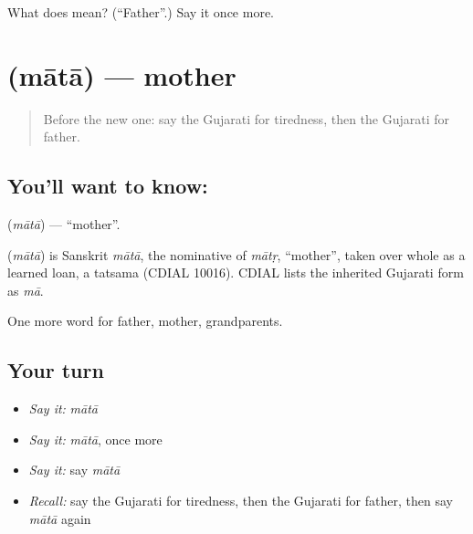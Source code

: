 \begin{tcolorbox}[breakable,colback=teal!4,colframe=teal!35!black,title={Before you move on}]
What does  mean? (\textquotedblleft{}Father\textquotedblright{}.) Say it once more.
\end{tcolorbox}
\section[\texorpdfstring{\gu{માતા} (mātā)}{માતા (mātā)}]{ (mātā) — mother}

\label{lesson:GU-C51-mother}



\begin{quote}
Before the new one: say the Gujarati for tiredness, then the Gujarati for father.
\end{quote}

\subsection*{You'll want to know: }
\textbf{} (\emph{mātā}) — \textquotedblleft{}mother\textquotedblright{}.

\begin{cousinweb}
\textbf{} (\emph{mātā}) is Sanskrit \emph{mātā}, the nominative of \emph{mātṛ}, \textquotedblleft{}mother\textquotedblright{}, taken over whole as a learned loan, a tatsama (CDIAL 10016). CDIAL lists the inherited Gujarati form as \emph{mā}.
\end{cousinweb}

\begin{grammarlens}[title={What you've built}]
One more word for father, mother, grandparents.
\end{grammarlens}

\subsection*{Your turn}
\begin{itemize}
\raggedright
  \item \emph{Say it:} \emph{mātā}
  \item \emph{Say it:} \emph{mātā}, once more
  \item \emph{Say it:} say \emph{mātā}
  \item \emph{Recall:} say the Gujarati for tiredness, then the Gujarati for father, then say \emph{mātā} again
\end{itemize}

